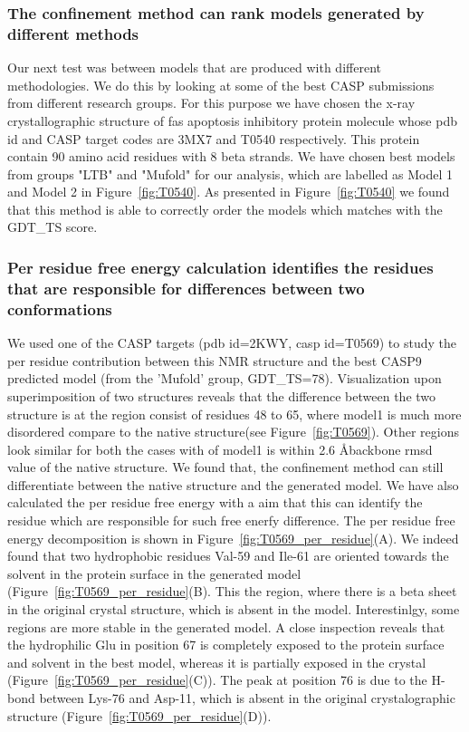 \documentclass[12pt]{article}
\begin{document}
\subsubsection{The confinement method can rank models generated by different methods}

Our next test was between models that are produced with different methodologies. We do this by
looking at some of the best CASP submissions from different research groups. 
For this purpose we have chosen the x-ray crystallographic structure of 
fas apoptosis inhibitory protein molecule whose pdb id and CASP target codes are 3MX7 and T0540 respectively.
This protein contain 90 amino acid residues with 8 beta strands. We have chosen best models from groups
"LTB" and "Mufold" for our analysis, which are labelled as Model 1 and Model 2 in Figure~\ref{fig:T0540}.
As presented in  Figure~\ref{fig:T0540} we found that this method is able to correctly order the models which matches
with the GDT\_TS score. 

\subsubsection{Per residue free energy calculation identifies the residues that are responsible for
differences between two conformations}

We used one of the CASP targets (pdb id=2KWY, casp id=T0569) to study the per residue contribution
between this NMR structure and the best CASP9 predicted model (from the 'Mufold' group, GDT\_TS=78).
Visualization upon superimposition of two structures reveals that
the difference between the two structure is at the region consist of residues 48 to 65, where model1 is much more disordered compare to the
native structure(see Figure~\ref{fig:T0569}). Other regions look similar for both the cases with of model1 is within 2.6 \AA backbone
rmsd value of the native structure. We found that, the confinement method can still differentiate between the native structure and 
the generated model. We have also calculated the per residue free energy with a aim that this can identify the residue which are responsible
for such free enerfy difference. The per residue free energy decomposition is shown in  Figure~\ref{fig:T0569_per_residue}(A). We indeed 
found that two hydrophobic residues Val-59 and Ile-61 are oriented towards the solvent in the protein 
surface in the generated model (Figure~\ref{fig:T0569_per_residue}(B). This the region, where there is a beta sheet in the original crystal structure, which is absent in the 
model. Interestinlgy, some regions are more stable in the generated model. A close inspection
reveals that 
the hydrophilic Glu in position 67 is completely exposed to the protein surface and solvent in the best model, whereas it is partially exposed in the 
crystal (Figure~\ref{fig:T0569_per_residue}(C)). The peak at position 76 is due to the H-bond between Lys-76 and Asp-11, 
which is absent in the original crystalographic structure (Figure~\ref{fig:T0569_per_residue}(D)). 
   
\end{document}
